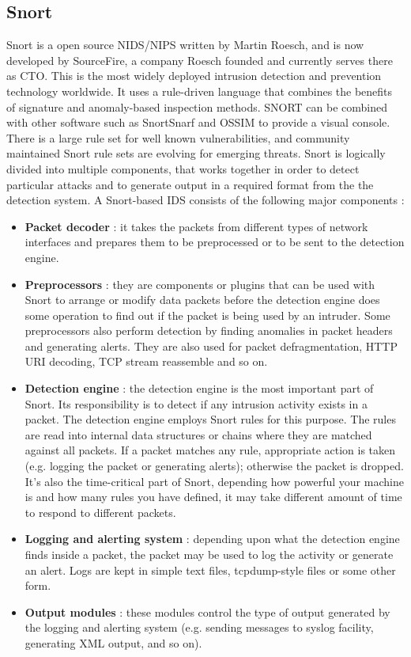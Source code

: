 \documentclass[11pt]{article}
\begin{document}
\subsection{Snort}
Snort is a open source NIDS/NIPS written by Martin Roesch, and is now developed by SourceFire, a company Roesch founded and currently serves there as CTO. This is the most widely deployed intrusion detection and prevention technology worldwide. It uses a rule-driven language that combines the benefits of signature and anomaly-based inspection methods. SNORT can be combined with other software such as SnortSnarf and OSSIM to provide a visual console. There is a large rule set for well known vulnerabilities, and community maintained Snort rule sets are evolving for emerging threats. Snort is logically divided into multiple components, that works together in order to detect particular attacks and to generate output in a required format from the the detection system. A Snort-based IDS consists of the following major components :
\begin{itemize}
\item \textbf{Packet decoder} : it takes the packets from different types of network interfaces and prepares them to be preprocessed or to be sent to the detection engine.
\item \textbf{Preprocessors} : they are components or plugins that can be used with Snort to arrange or modify data packets before the detection engine does some operation to find out if the packet is being used by an intruder. Some preprocessors also perform detection by finding anomalies in packet headers and generating alerts. They are also used for packet defragmentation, HTTP URI decoding, TCP stream reassemble and so on.
\item \textbf{Detection engine} : the detection engine is the most important part of Snort. Its responsibility is to detect if any intrusion activity exists in a packet. The detection engine employs Snort rules for this purpose. The rules are read into internal data structures or chains where they are matched against all packets. If a packet matches any rule, appropriate action is taken (e.g. logging the packet or generating alerts); otherwise the packet is dropped. It's also the time-critical part of Snort, depending how powerful your machine is and how many rules you have defined, it may take different amount of time to respond to different packets. 
\item \textbf{Logging and alerting system} : depending upon what the detection engine finds inside a packet, the packet may be used to log the activity or generate an alert. Logs are kept in simple text files, tcpdump-style files or some other form.
\item \textbf{Output modules} : these modules control the type of output generated by the logging and alerting system (e.g. sending messages to syslog facility, generating XML output, and so on).
\end{itemize}
\end{document}
